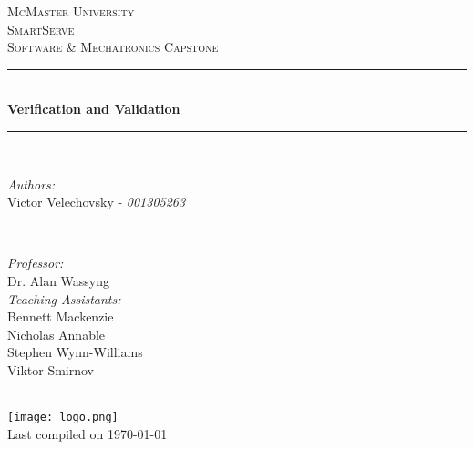 \documentclass[11pt]{article}
\begin{document}
\begin{titlepage}
	\newcommand{\HRule}{\rule{\linewidth}{0.2mm}}
	\begin{center}
	\textsc{\LARGE McMaster University}\\[1.5cm]

	\textsc{\Large SmartServe}\\[0.5cm]
	\textsc{\large Software \& Mechatronics Capstone}\\[0.5cm]

	\HRule\\[0.4cm]
		{\huge\bfseries Verification and Validation}\\[0.4cm]
	\HRule\\[0.4cm]

	\begin{minipage}[t][][t]{0.5\textwidth}
		\begin{flushleft} \large
			\emph{Authors:}\\
			Victor Velechovsky - \textit{001305263} \\
		\end{flushleft}
	\end{minipage}
	~
	\begin{minipage}[t][][t]{0.4\textwidth}
		\begin{flushright} \large
			\emph{Professor:} \\
			Dr. Alan Wassyng \\[0.4cm]
			\emph{Teaching Assistants:} \\
			Bennett Mackenzie \\
			Nicholas Annable \\
			Stephen Wynn-Williams \\
			Viktor Smirnov
		\end{flushright}
	\end{minipage}\\[2cm]

	\texttt{[image: logo.png]} \\
	{\large Last compiled on \today}
	\end{center}

\end{titlepage}

\tableofcontents
\listoffigures
\listoftables
\end{document}
